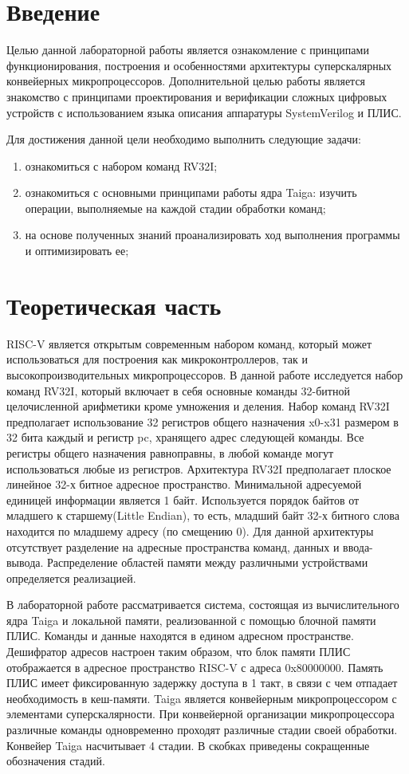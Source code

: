 \chapter{Введение}
Целью данной лабораторной работы является ознакомление с принципами функционирования, построения и особенностями архитектуры суперскалярных конвейерных микропроцессоров. Дополнительной целью работы является знакомство с принципами проектирования и верификации сложных цифровых устройств с использованием языка описания аппаратуры SystemVerilog и ПЛИС.

Для достижения данной цели необходимо выполнить следующие задачи:
\begin{enumerate}
	\item ознакомиться с набором команд RV32I;
	\item ознакомиться с основными принципами работы ядра Taiga: изучить операции, выполняемые на каждой стадии обработки команд;
	\item на основе полученных знаний проанализировать ход выполнения программы и оптимизировать ее;
\end{enumerate}

\chapter{Теоретическая часть}

RISC-V является открытым современным набором команд, который может использоваться для построения как микроконтроллеров, так и высокопроизводительных микропроцессоров. В данной работе исследуется набор команд RV32I, который включает в себя основные команды 32-битной целочисленной арифметики кроме умножения и деления. Набор команд RV32I предполагает использование 32 регистров общего назначения x0-x31 размером в 32 бита каждый и регистр pc, хранящего адрес следующей команды. Все регистры общего назначения равноправны, в любой команде могут использоваться любые из регистров. Архитектура RV32I предполагает плоское линейное 32-х битное адресное пространство. Минимальной адресуемой единицей информации является 1 байт. Используется порядок байтов от младшего к старшему(Little Endian), то есть, младший байт 32-х битного слова находится по младшему адресу (по смещению 0). Для данной архитектуры отсутствует разделение на адресные пространства команд, данных и ввода-вывода. Распределение областей памяти между различными устройствами определяется реализацией.

В лабораторной работе рассматривается система, состоящая из вычислительного ядра Taiga и локальной памяти, реализованной с помощью блочной памяти ПЛИС. Команды и данные находятся в едином адресном пространстве. Дешифратор адресов настроен таким образом, что блок памяти ПЛИС отображается в адресное пространство RISC-V с адреса 0x80000000. Память ПЛИС имеет фиксированную задержку доступа в 1 такт, в связи с чем отпадает необходимость в кеш-памяти. Taiga является конвейерным микропроцессором с элементами суперскалярности. При конвейерной организации микропроцессора различные команды одновременно проходят различные стадии своей обработки. Конвейер Taiga насчитывает 4 стадии. В скобках приведены сокращенные обозначения стадий.

